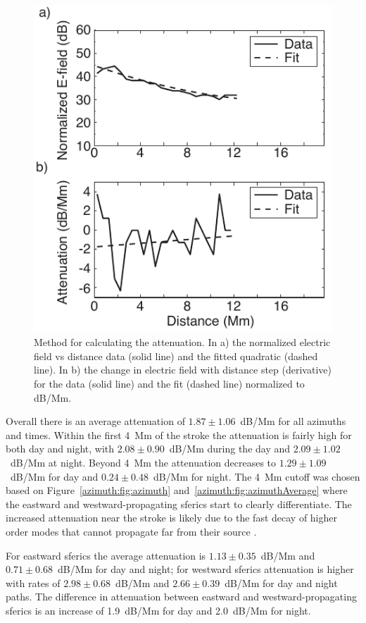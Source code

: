 \begin{figure}[h!t]
    \centering
    \includegraphics[scale=1]{Azimuth/Figures/attenuationCalculation.pdf} 
    \caption{Method for calculating the attenuation.
    	In a) the normalized electric field vs distance data (solid line) and the fitted quadratic (dashed line).
	In b) the change in electric field with distance step (derivative) for the data (solid line) and the fit (dashed line) normalized to dB/Mm.}
    \label{azimuth:fig:attenuationCalculation}
 \end{figure}

Overall there is an average attenuation of $1.87\pm1.06$~dB/Mm for all azimuths and times.
Within the first 4~Mm of the stroke the attenuation is fairly high for both day and night, with $2.08\pm0.90$~dB/Mm during the day and $2.09\pm1.02$~dB/Mm at night.
Beyond 4~Mm the attenuation decreases to $1.29\pm1.09$~dB/Mm for day and $0.24\pm0.48$~dB/Mm for night.
The 4~Mm cutoff was chosen based on Figure~\ref{azimuth:fig:azimuth} and~\ref{azimuth:fig:azimuthAverage} where the eastward and westward-propagating sferics start to clearly differentiate.
The increased attenuation near the stroke is likely due to the fast decay of higher order modes that cannot propagate far from their source \citep{Wait1970}.

For eastward sferics the average attenuation is $1.13\pm0.35$~dB/Mm and $0.71\pm0.68$~dB/Mm for day and night; for westward sferics attenuation is higher with rates of $2.98\pm0.68$~dB/Mm and $2.66\pm0.39$~dB/Mm for day and night paths.
The difference in attenuation between eastward and westward-propagating sferics is an increase of  1.9~dB/Mm for day and 2.0~dB/Mm for night.
  
